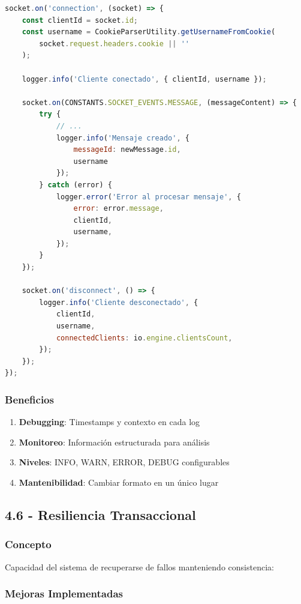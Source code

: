 \documentclass[12pt,a4paper]{article}
\begin{document}
\begin{lstlisting}[caption=Uso de Logger, language=JavaScript]
socket.on('connection', (socket) => {
    const clientId = socket.id;
    const username = CookieParserUtility.getUsernameFromCookie(
        socket.request.headers.cookie || ''
    );

    logger.info('Cliente conectado', { clientId, username });

    socket.on(CONSTANTS.SOCKET_EVENTS.MESSAGE, (messageContent) => {
        try {
            // ...
            logger.info('Mensaje creado', { 
                messageId: newMessage.id, 
                username 
            });
        } catch (error) {
            logger.error('Error al procesar mensaje', {
                error: error.message,
                clientId,
                username,
            });
        }
    });

    socket.on('disconnect', () => {
        logger.info('Cliente desconectado', {
            clientId,
            username,
            connectedClients: io.engine.clientsCount,
        });
    });
});
\end{lstlisting}

\subsubsection{Beneficios}
\begin{enumerate}
    \item \textbf{Debugging}: Timestamps y contexto en cada log
    \item \textbf{Monitoreo}: Información estructurada para análisis
    \item \textbf{Niveles}: INFO, WARN, ERROR, DEBUG configurables
    \item \textbf{Mantenibilidad}: Cambiar formato en un único lugar
\end{enumerate}

\subsection{4.6 - Resiliencia Transaccional}

\subsubsection{Concepto}
Capacidad del sistema de recuperarse de fallos manteniendo consistencia:

\subsubsection{Mejoras Implementadas}
\end{document}
